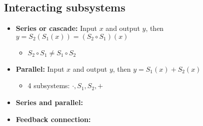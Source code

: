 \subsection{Interacting subsystems}
\begin{definition}
    \begin{itemize}
        \item \textbf{Series or cascade:} Input $x$ and output $y$, then $y = S_2(S_1(x)) = (S_2 \circ S_1)(x)$
        \begin{itemize}
            \item $S_2 \circ S_1 \neq S_1 \circ S_2$
        \end{itemize}
        \item \textbf{Parallel:} Input $x$ and output $y$, then $y=S_1 (x) + S_2 (x)$
        \begin{itemize}
            \item 4 subsystems: $\cdot, S_1, S_2, +$
        \end{itemize}
        \item \textbf{Series and parallel:}
        \item \textbf{Feedback connection:}
    \end{itemize}
\end{definition}

